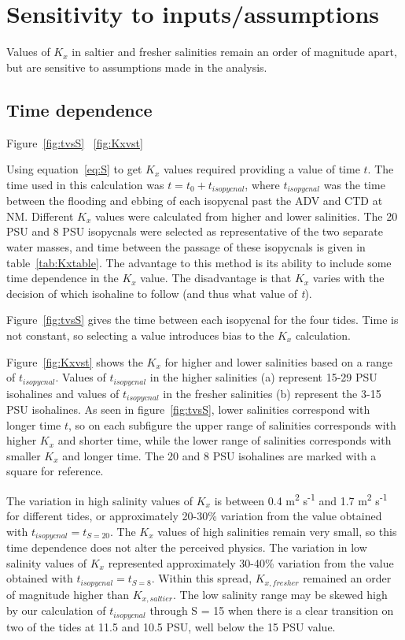 \section{Sensitivity to inputs/assumptions} \label{sec:Sensitivity}

Values of $K_x$ in saltier and fresher salinities remain an order of magnitude apart, but are sensitive to assumptions made in the analysis.

\subsection{Time dependence}

Figure~\ref{fig:tvsS} ~\ref{fig:Kxvst}

Using equation~\ref{eq:S} to get $K_x$ values required providing a value of time $t$. The time used in this calculation was $t=t_0 + t_{isopycnal}$, where $t_{isopycnal}$ was the time between the flooding and ebbing of each isopycnal past the ADV and CTD at NM. Different $K_x$ values were calculated from higher and lower salinities. The 20 PSU and 8 PSU isopycnals were selected as representative of the two separate water masses, and time between the passage of these isopycnals is given in table~\ref{tab:Kxtable}. The advantage to this method is its ability to include some time dependence in the $K_x$ value. The disadvantage is that $K_x$ varies with the decision of which isohaline to follow (and thus what value of \emph{t}). 

Figure~\ref{fig:tvsS} gives the time between each isopycnal for the four tides. Time is not constant, so selecting a value introduces bias to the $K_x$ calculation.

Figure~\ref{fig:Kxvst} shows the $K_x$ for higher and lower salinities based on a range of $t_{isopycnal}$. Values of $t_{isopycnal}$ in the higher salinities (a) represent 15-29 PSU isohalines and values of $t_{isopycnal}$ in the fresher salinities (b) represent the 3-15 PSU isohalines. As seen in figure~\ref{fig:tvsS}, lower salinities correspond with longer time $t$, so on each subfigure the upper range of salinities corresponds with higher $K_x$ and shorter time, while the lower range of salinities corresponds with smaller $K_x$ and longer time. The 20 and 8 PSU isohalines are marked with a square for reference.

The variation in high salinity values of $K_x$ is between 0.4 m\textsuperscript{2} s\textsuperscript{-1} and 1.7 m\textsuperscript{2} s\textsuperscript{-1} for different tides, or approximately 20-30\% variation from the value obtained with $t_{isopycnal}=t_{S=20}$. The $K_x$ values of high salinities remain very small, so this time dependence does not alter the perceived physics. The variation in low salinity values of $K_x$ represented approximately 30-40\% variation from the value obtained with $t_{isopycnal}=t_{S=8}$. Within this spread, $K_{x,fresher}$ remained an order of magnitude higher than $K_{x,saltier}$. The low salinity range may be skewed high by our calculation of $t_{isopycnal}$ through S = 15 when there is a clear transition on two of the tides at 11.5 and 10.5 PSU, well below the 15 PSU value. 

